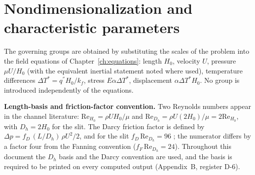 \chapter{Nondimensionalization and characteristic parameters}
\label{ch:dimensionless}

The governing groups are obtained by substituting the scales of the problem into the field
equations of Chapter~\ref{ch:equations}: length $H_0$, velocity $U$, pressure $\mu U/H_0$ (with the
equivalent inertial statement noted where used), temperature differences $\Delta T^*=q^{''}H_0/k_f$,
stress $E\alpha\Delta T^*$, displacement $\alpha\Delta T^*H_0$. No group is introduced
independently of the equations.

\textbf{Length-basis and friction-factor convention.} Two Reynolds numbers appear in the channel
literature: $\mathrm{Re}_{H_0}=\rho UH_0/\mu$ and $\mathrm{Re}_{D_h}=\rho U(2H_0)/\mu=2\mathrm{Re}_{H_0}$,
with $D_h=2H_0$ for the slit. The Darcy friction factor is defined by
$\Delta p=f_D\,(L/D_h)\,\rho U^2/2$, and for the slit $f_D\,\mathrm{Re}_{D_h}=96$
\cite{shah1978laminar}; the numerator differs by a factor four from the Fanning convention
($f_F\,\mathrm{Re}_{D_h}=24$). Throughout this document the $D_h$ basis and the Darcy convention
are used, and the basis is required to be printed on every computed output (Appendix~B, register
D-6).

